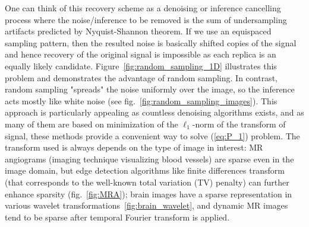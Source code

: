 One can think of this recovery scheme as a denoising or inference cancelling process where the noise/inference to be removed is the sum of undersampling artifacts predicted by Nyquist-Shannon theorem. If we use an equispaced sampling pattern, then the resulted noise is basically shifted copies of the signal and hence recovery of the original signal is impossible as each replica is an equally likely candidate. Figure~\ref{fig:random_sampling_1D} illustrates this problem and demonstrates the advantage of random sampling. In contrast, random sampling "spreads" the noise uniformly over the image, so the inference acts mostly like white noise (see fig.~\ref{fig:random_sampling_images}). This approach is particularly appealing as countless denoising algorithms exists, and as many of them are based on minimization of the $\ell_1$-norm of the transform of signal, these methods provide a convenient way to solve (\ref{eq:P_1}) problem. The transform used is always depends on the type of image in interest: MR angiograms (imaging technique visualizing blood vessels) are sparse even in the image domain, but edge detection algorithms like finite differences transform (that corresponds to the well-known total variation (TV) penalty) can further enhance sparsity (fig.~\ref{fig:MRA}); brain images have a sparse representation in various wavelet transformations~\ref{fig:brain_wavelet}, and dynamic MR images tend to be sparse after temporal Fourier transform is applied.

